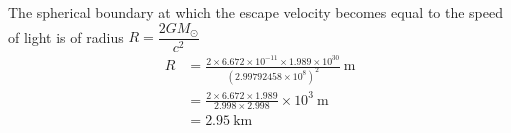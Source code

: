 The spherical boundary at which the escape velocity becomes equal to the speed
of light is of radius $R = \dfrac{2GM_\odot}{c^2}$
\begin{align*}
R &= \frac{2 \times 6.672 \times 10^{-11} \times 1.989 \times 10^{30}}
         {\left(2.99792458 \times 10^{8}\right)^2}~\mathrm{m}\\
  &= \frac{2 \times 6.672 \times 1.989}{2.998 \times 2.998} \times 10^{3}~\mathrm{m}\\
  &= 2.95~\mathrm{km}
\end{align*}
